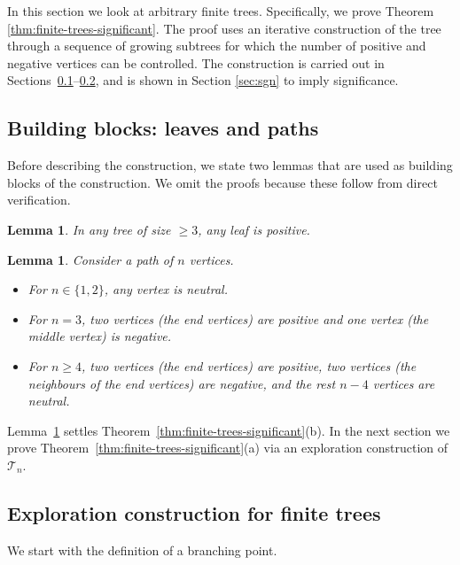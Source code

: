 \documentclass[11pt]{article}
\numberwithin{equation}{section}
\theoremstyle{plain}
\newtheorem{lemma}[theorem]{Lemma}
\newcommand{\Tt}{\mathcal{T}}
\begin{document}
In this section we look at arbitrary finite trees. Specifically, we prove Theorem \ref{thm:finite-trees-significant}. The proof uses an iterative construction of the tree through a sequence of growing subtrees for which the number of positive and negative vertices can be controlled. The construction is carried out in Sections~\ref{ss:bb}--\ref{ss:alg}, and is shown in Section \ref{sec:sgn} to imply significance.


\subsection{Building blocks: leaves and paths}
\label{ss:bb}

Before describing the construction, we state two lemmas that are used as building blocks of the construction. We omit the proofs because these follow from direct verification. 

\begin{lemma}
\label{lem1}
In any tree of size $\geq 3$, any leaf is positive.
\end{lemma}

\begin{lemma}
\label{lem2}
Consider a path of $n$ vertices.
\begin{itemize}
\item[(a)] For $n \in \{1,2\}$, any vertex is neutral.
\item[(b)] For $n = 3$, two vertices (the end vertices) are positive  and one vertex (the middle vertex) is negative.
\item[(c)] For $n \geq 4$, two vertices (the end vertices) are positive, two vertices (the neighbours of the end vertices) are negative, and the rest $n-4$ vertices are neutral.
\end{itemize}
\end{lemma}

\noindent
Lemma~\ref{lem2} settles Theorem~\ref{thm:finite-trees-significant}(b). In the next section we prove Theorem~\ref{thm:finite-trees-significant}(a) via an exploration construction of $\Tt_n$.


\subsection{Exploration construction for finite trees}
\label{ss:alg}

We start with the definition of a branching point.
\end{document}
